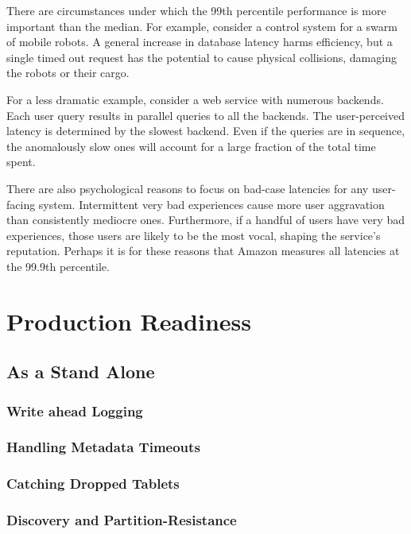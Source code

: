 \documentclass[11pt]{article}
\begin{document}
There are circumstances under which the 99th percentile performance is more important than the median.  For example, consider a control system for a swarm of mobile robots. A general increase in database latency harms efficiency, but a single timed out request has the potential to cause physical collisions, damaging the robots or their cargo.  

For a less dramatic example, consider a web service with numerous backends.  Each user query results in parallel queries to all the backends.  The user-perceived latency is determined by the slowest backend.  Even if the queries are in sequence, the anomalously slow ones will account for a large fraction of the total time spent.

There are also psychological reasons to focus on bad-case latencies for any user-facing system.  Intermittent very bad experiences cause more user aggravation than consistently mediocre ones.\cite{needed}  Furthermore, if a handful of users have very bad experiences, those users are likely to be the most vocal, shaping the service's reputation.  Perhaps it is for these reasons that Amazon measures all latencies at the 99.9th percentile\cite{amazon}.

\section{Production Readiness}

\subsection{As a Stand Alone}

\subsubsection{Write ahead Logging}

\subsubsection{Handling Metadata Timeouts}

\subsubsection{Catching Dropped Tablets}

\subsubsection{Discovery and Partition-Resistance}
\end{document}
